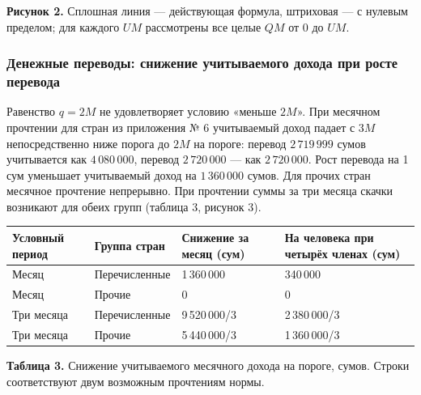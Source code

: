 \documentclass[14pt,a4paper]{extarticle}
\begin{document}
\begin{center}\end{center}
\textbf{Рисунок 2.} Сплошная линия — действующая формула, штриховая — с нулевым пределом; для каждого $UM$ рассмотрены все целые $QM$ от $0$ до $UM$.

\subsubsection{Денежные переводы: снижение учитываемого дохода при росте перевода}\label{res:rem}
Равенство $q=2M$ не удовлетворяет условию «меньше $2M$». При месячном прочтении для стран из приложения № 6 учитываемый доход падает с $3M$ непосредственно ниже порога до $2M$ на пороге: перевод $2\,719\,999$ сумов учитывается как $4\,080\,000$, перевод $2\,720\,000$ — как $2\,720\,000$. Рост перевода на 1 сум уменьшает учитываемый доход на $1\,360\,000$ сумов. Для прочих стран месячное прочтение непрерывно. При прочтении суммы за три месяца скачки возникают для обеих групп (таблица 3, рисунок 3).

\begingroup\fontsize{11bp}{13.2bp}\selectfont
\begin{longtable}{p{} p{} p{} p{}}
\toprule
Условный период & Группа стран & Снижение за месяц (сум) & На человека при четырёх членах (сум) \\
\midrule
\endhead
Месяц & Перечисленные & 1\,360\,000 & 340\,000 \\
Месяц & Прочие & 0 & 0 \\
Три месяца & Перечисленные & 9\,520\,000/3 & 2\,380\,000/3 \\
Три месяца & Прочие & 5\,440\,000/3 & 1\,360\,000/3 \\
\bottomrule
\end{longtable}
\endgroup
\textbf{Таблица 3.} Снижение учитываемого месячного дохода на пороге, сумов. Строки соответствуют двум возможным прочтениям нормы.
\end{document}
